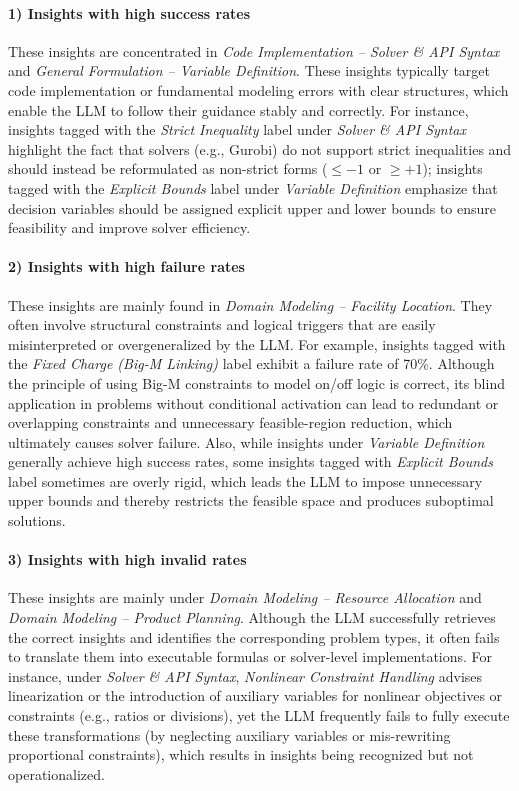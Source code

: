 \documentclass[sigconf, nonacm]{acmart}
\begin{document}
\paragraph{1) Insights with high success rates}
These insights are concentrated in \emph{Code Implementation – Solver \& API Syntax} and \emph{General Formulation – Variable Definition}. These insights typically target code implementation or fundamental modeling errors with clear structures, which enable the LLM to follow their guidance stably and correctly. For instance, insights tagged with the \emph{Strict Inequality} label under \emph{Solver \& API Syntax} highlight the fact that solvers (e.g., Gurobi) do not support strict inequalities and should instead be reformulated as non-strict forms ($\leq -1$ or $\geq +1$); insights tagged with the \emph{Explicit Bounds} label under \emph{Variable Definition} emphasize that decision variables should be assigned explicit upper and lower bounds to ensure feasibility and improve solver efficiency.

\paragraph{2) Insights with high failure rates}
These insights are mainly found in \emph{Domain Modeling – Facility Location}. They often involve structural constraints and logical triggers that are easily misinterpreted or overgeneralized by the LLM. For example, insights tagged with the \emph{Fixed Charge (Big-M Linking)} label exhibit a failure rate of 70\%. Although the principle of using Big-M constraints to model on/off logic is correct, its blind application in problems without conditional activation can lead to redundant or overlapping constraints and unnecessary feasible-region reduction, which ultimately causes solver failure. Also, while insights under \emph{Variable Definition} generally achieve high success rates, some insights tagged with \emph{Explicit Bounds} label sometimes are overly rigid, which leads the LLM to impose unnecessary upper bounds and thereby restricts the feasible space and produces suboptimal solutions.

\paragraph{3) Insights with high invalid rates}
These insights are mainly under \emph{Domain Modeling – Resource Allocation} and \emph{Domain Modeling – Product Planning}. Although the LLM successfully retrieves the correct insights and identifies the corresponding problem types, it often fails to translate them into executable formulas or solver-level implementations. For instance, under \emph{Solver \& API Syntax}, \emph{Nonlinear Constraint Handling} advises linearization or the introduction of auxiliary variables for nonlinear objectives or constraints (e.g., ratios or divisions), yet the LLM frequently fails to fully execute these transformations (by neglecting auxiliary variables or mis-rewriting proportional constraints), which results in insights being recognized but not operationalized.
\end{document}
